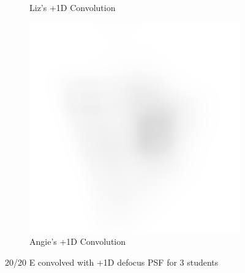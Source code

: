 \documentclass{article}
\begin{document}
\begin{figure}[H]
\begin{subfigure}{.3\textwidth}
  \caption{Liz's +1D Convolution}
  \label{fig:liz1d}
\end{subfigure}
\begin{subfigure}{.3\textwidth}
  \centering
  \includegraphics[width=1\linewidth]{Angie_R_0526_1_500_zer_1_5_PSF_convE.png}
  \caption{Angie's +1D Convolution}
  \label{fig:angie1d}
\end{subfigure}
\caption{20/20 E convolved with +1D defocus PSF for 3 students}

\label{fig:Defocus_1D}
\end{figure}

\clearpage
\end{document}
